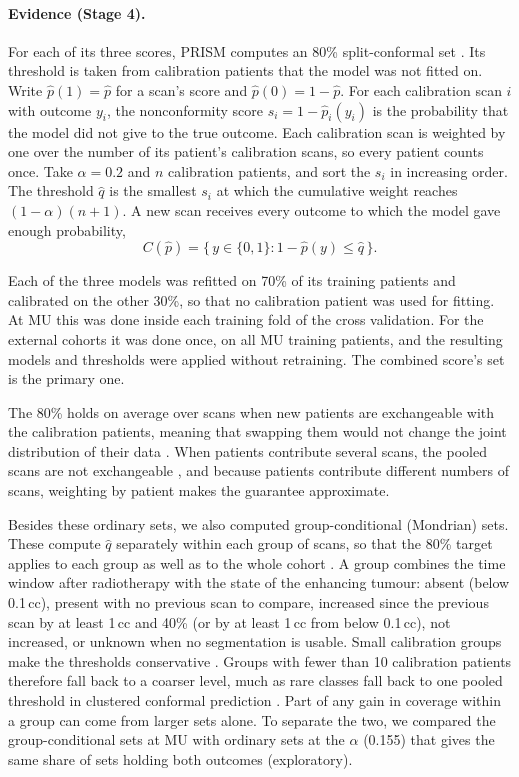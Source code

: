 \documentclass[largeformat]{interact} %
\begin{document}
\paragraph*{Evidence (Stage 4).} For each of its three scores, PRISM computes an 80\% split-conformal set
\citep{angelopoulos2023}. Its threshold is taken from calibration patients that the model was not fitted on. Write $\hat p(1) = \hat p$ for a scan's score and $\hat p(0) = 1 - \hat p$. For each calibration scan $i$
with outcome $y_i$, the nonconformity score $s_i = 1 - \hat p_i(y_i)$ is the probability that the model did not give
to the true outcome. Each calibration scan is weighted by one over the number of its patient's calibration scans, so
every patient counts once. Take $\alpha = 0.2$ and $n$ calibration patients, and sort the $s_i$ in increasing
order. The threshold $\hat q$ is the smallest $s_i$ at which the cumulative weight reaches $(1 - \alpha)(n + 1)$. A new scan
receives every outcome to which the model gave enough probability,
\begin{equation}
C(\hat p) = \{\, y \in \{0, 1\} : 1 - \hat p(y) \le \hat q \,\}.
\end{equation}

Each of the three models was refitted on 70\% of its training patients and calibrated on the other 30\%,
so that no calibration patient was used for fitting. At MU this was done inside each training fold of the cross
validation. For the external cohorts it was done once, on all MU training patients, and the resulting models and
thresholds were applied without retraining. The combined score's set is the primary one.

The 80\% holds on average over scans when new patients are exchangeable with the calibration patients, meaning that
swapping them would not change the joint distribution of their data \citep{romano2020,barber2021limits,mehrtens2023}. When patients contribute several scans, the pooled scans are not exchangeable \citep{dunn2023}, and because patients contribute different numbers of scans, weighting by patient makes the
guarantee approximate.

Besides these ordinary sets, we also computed group-conditional (Mondrian) sets. These compute $\hat q$ separately within each group of scans, so
that the 80\% target applies to each group as well as to the whole cohort \citep{vovk2022book}. A group combines the
time window after radiotherapy with the state of the enhancing tumour: absent (below 0.1\,cc), present with no previous scan to compare, increased since the previous scan by at least 1\,cc and 40\% (or by at
least 1\,cc from below 0.1\,cc), not increased, or unknown when no segmentation is usable. Small calibration
groups make the thresholds conservative \citep{johansson2015}. Groups with fewer than 10 calibration patients therefore
fall back to a coarser level, much as rare classes fall back to one pooled threshold in clustered conformal
prediction \citep{ding2023}. Part of any gain in
coverage within a group can come from larger sets alone. To separate the two, we compared the group-conditional sets at MU with
ordinary sets at the $\alpha$ (0.155) that gives the same share of sets holding both outcomes (exploratory).
\end{document}
